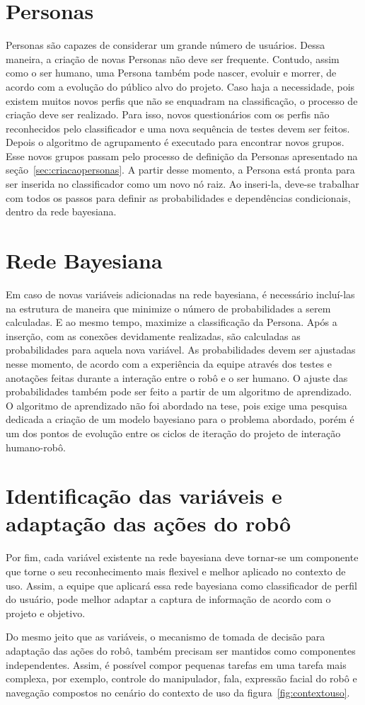 \section{Personas}
\label{sec:personasnovas}
Personas são capazes de considerar um grande número de usuários. Dessa maneira, a criação de novas Personas não deve ser frequente. Contudo, assim como o ser humano, uma Persona também pode nascer, evoluir e morrer, de acordo com a evolução do público alvo do projeto. Caso haja a necessidade, pois existem muitos novos perfis que não se enquadram na classificação, o processo de criação deve ser realizado. Para isso, novos questionários com os perfis não reconhecidos pelo classificador e uma nova sequência de testes devem ser feitos. Depois o algoritmo de agrupamento é executado para encontrar novos grupos. Esse novos grupos passam pelo processo de definição da Personas apresentado na seção~\ref{sec:criacaopersonas}. A partir desse momento, a Persona está pronta para ser inserida no classificador como um novo nó raiz. Ao inseri-la, deve-se trabalhar com todos os passos para definir as probabilidades e dependências condicionais, dentro da rede bayesiana.

\section{Rede Bayesiana}
\label{sec:novarb}
Em caso de novas variáveis adicionadas na rede bayesiana, é necessário incluí-las na estrutura de maneira que minimize o número de probabilidades a serem calculadas. E ao mesmo tempo, maximize a classificação da Persona. Após a inserção, com as conexões devidamente realizadas, são calculadas as probabilidades para aquela nova variável. As probabilidades devem ser ajustadas nesse momento, de acordo com a experiência da equipe através dos testes e anotações feitas durante a interação entre o robô e o ser humano. O ajuste das probabilidades também pode ser feito a partir de um algoritmo de aprendizado. O algoritmo de aprendizado não foi abordado na tese, pois exige uma pesquisa dedicada a criação de um modelo bayesiano para o problema abordado, porém é um dos pontos de evolução entre os ciclos de iteração do projeto de interação humano-robô.

\section{Identificação das variáveis e adaptação das ações do robô}
\label{sec:ivaar}
Por fim, cada variável existente na rede bayesiana deve tornar-se um componente que torne o seu reconhecimento mais flexivel e melhor aplicado no contexto de uso. Assim, a equipe que aplicará essa rede bayesiana como classificador de perfil do usuário, pode melhor adaptar a captura de informação de acordo com o projeto e objetivo.

Do mesmo jeito que as variáveis, o mecanismo de tomada de decisão para adaptação das ações do robô, também precisam ser mantidos como componentes independentes. Assim, é possível compor pequenas tarefas em uma tarefa mais complexa, por exemplo, controle do manipulador, fala, expressão facial do robô e navegação compostos no cenário do contexto de uso da figura~\ref{fig:contextouso}.
